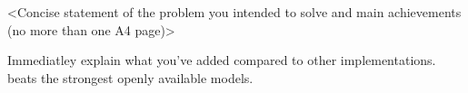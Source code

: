 <Concise statement of the problem you intended to solve and main achievements (no more than one A4 page)>

Immediatley explain what you've added compared to other implementations. beats the strongest openly available models.